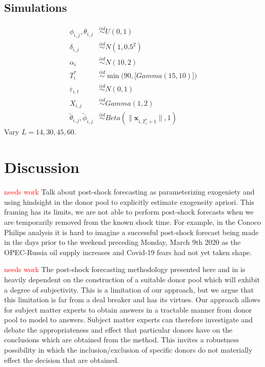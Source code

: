 \documentclass[11pt]{article}
\def\mbf#1{\mathbf{#1}} %
\newcommand{\simiid}{\stackrel{iid}{\sim}} %
\theoremstyle{definition}
\begin{document}
\subsection{Simulations}
\label{simulation}


\begin{align*}
	\phi_{i,j}, \theta_{i,j}  & \simiid U(0,1) \\ 
	\delta_{i,j} & \simiid N(1,0.5^2) \\
	\alpha_i & \simiid N(10, 2) \\
	T_i^* & \simiid \min\Big(90, \big[Gamma(15,10)\big]\Big) \\
	\varepsilon_{i,t} & \simiid N(0,1)\\
	X_{i,j} & \simiid Gamma(1,2) \\
	\tilde{\theta}_{i,j},\tilde{\phi}_{i,j} & \simiid Beta(\|\mbf{x}_{i,T_i^*+1}\|,1)
\end{align*}
Vary $L = 14, 30, 45,60$.



\section{Discussion}

\textcolor{red}{needs work} Talk about post-shock forecasting as parameterizing exogeniety and using hindsight in the donor pool to explicitly estimate exogeneity apriori. This framing has its limits, we are not able to perform post-shock forecasts when we are temporarily removed from the known shock time. For example, in the Conoco Philips analysis it is hard to imagine a successful post-shock forecast being made in the days prior to the weekend preceding Monday, March 9th 2020 as the OPEC-Russia oil supply increases and Covid-19 fears had not yet taken shape.

\textcolor{red}{needs work} The post-shock forecasting methodology presented here and in \cite{lin2021minimizing} is heavily dependent on the construction of a suitable donor pool which will exhibit a degree of subjectivity. This is a limitation of our approach, but we argue that this limitation is far from a deal breaker and has its virtues. Our approach allows for subject matter experts to obtain answers in a tractable manner from donor pool to model to answers. Subject matter experts can therefore investigate and debate the appropriateness and effect that particular donors have on the conclusions which are obtained from the method. This invites a robustness possibility in which the inclusion/exclusion of specific donors do not materially effect the decision that are obtained.
\end{document}
